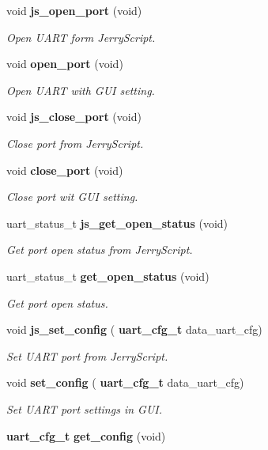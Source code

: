\begin{DoxyCompactItemize}
void \textbf{ js\+\_\+open\+\_\+port} (void)
\begin{DoxyCompactList}\small\item\em Open U\+A\+RT form Jerry\+Script. \end{DoxyCompactList}\item 
void \textbf{ open\+\_\+port} (void)
\begin{DoxyCompactList}\small\item\em Open U\+A\+RT with G\+UI setting. \end{DoxyCompactList}\item 
void \textbf{ js\+\_\+close\+\_\+port} (void)
\begin{DoxyCompactList}\small\item\em Close port from Jerry\+Script. \end{DoxyCompactList}\item 
void \textbf{ close\+\_\+port} (void)
\begin{DoxyCompactList}\small\item\em Close port wit G\+UI setting. \end{DoxyCompactList}\item 
uart\+\_\+status\+\_\+t \textbf{ js\+\_\+get\+\_\+open\+\_\+status} (void)
\begin{DoxyCompactList}\small\item\em Get port open status from Jerry\+Script. \end{DoxyCompactList}\item 
uart\+\_\+status\+\_\+t \textbf{ get\+\_\+open\+\_\+status} (void)
\begin{DoxyCompactList}\small\item\em Get port open status. \end{DoxyCompactList}\item 
void \textbf{ js\+\_\+set\+\_\+config} (\textbf{ uart\+\_\+cfg\+\_\+t} data\+\_\+uart\+\_\+cfg)
\begin{DoxyCompactList}\small\item\em Set U\+A\+RT port from Jerry\+Script. \end{DoxyCompactList}\item 
void \textbf{ set\+\_\+config} (\textbf{ uart\+\_\+cfg\+\_\+t} data\+\_\+uart\+\_\+cfg)
\begin{DoxyCompactList}\small\item\em Set U\+A\+RT port settings in G\+UI. \end{DoxyCompactList}\item 
\textbf{ uart\+\_\+cfg\+\_\+t} \textbf{ get\+\_\+config} (void)

\end{DoxyCompactItemize}
